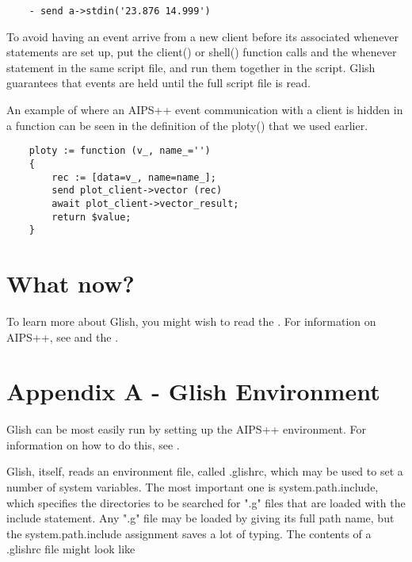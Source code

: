 \begin{verbatim}
	- send a->stdin('23.876 14.999')
\end{verbatim}

    To avoid having an event arrive from a new client before its associated
whenever statements are set up, put the client() or shell() function calls
and the whenever statement in the same script file, and run them together in
the script.  Glish guarantees that events are held until the full script
file is read.

    An example of where an AIPS++ event communication with a client is
hidden in a function can be seen in the definition of the ploty() that we
used earlier.

\begin{verbatim}
	ploty := function (v_, name_='')
	{
	    rec := [data=v_, name=name_];
	    send plot_client->vector (rec)
	    await plot_client->vector_result;
	    return $value;
	}
\end{verbatim}

\section{What now?}

To learn more about Glish, you might wish to read the
. For information on AIPS++,
see  and the
.

\section{Appendix A - Glish Environment}

Glish can be most easily run by setting up the AIPS++ environment.
For information on how to do this, see .

    Glish, itself, reads an environment file, called .glishrc, which may be
used to set a number of system variables.  The most important one is
system.path.include, which specifies the directories to be searched for
".g" files that are loaded with the include statement.  Any ".g" file may
be loaded by giving its full path name, but the system.path.include
assignment saves a lot of typing.  The contents of a .glishrc file might
look like

